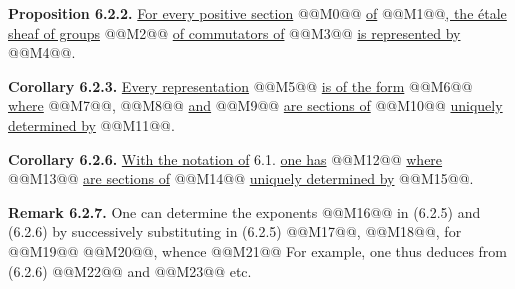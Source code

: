 
\textbf{Proposition 6.2.2.} \uline{For every positive section} @@M0@@ \uline{of} @@M1@@\uline{, the étale sheaf of groups} @@M2@@ \uline{of commutators of} @@M3@@ \uline{is represented by}
@@M4@@.

\textbf{Corollary 6.2.3.} \uline{Every representation}
@@M5@@
\uline{is of the form}
@@M6@@
\uline{where} @@M7@@, @@M8@@ \uline{and} @@M9@@ \uline{are sections of} @@M10@@ \uline{uniquely determined by} @@M11@@.

\textbf{Corollary 6.2.6.} \uline{With the notation of} 6.1. \uline{one has}
@@M12@@
\uline{where} @@M13@@ \uline{are sections of} @@M14@@ \uline{uniquely determined by} @@M15@@.

\textbf{Remark 6.2.7.} One can determine the exponents @@M16@@ in (6.2.5) and (6.2.6) by successively substituting in (6.2.5)
@@M17@@, @@M18@@, for @@M19@@ @@M20@@, whence
@@M21@@
For example, one thus deduces from (6.2.6)
@@M22@@
and
@@M23@@
etc.
